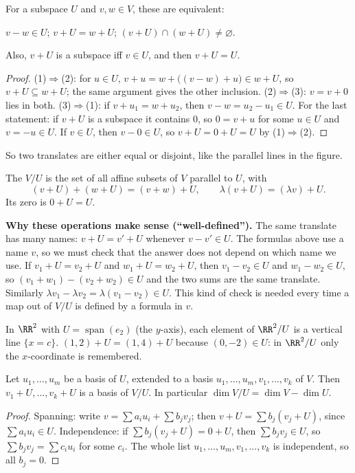 \documentclass[10pt]{scrartcl}
\DeclareMathOperator{\spn}{span}
\begin{document}
\begin{proposition*}
  For a subspace $U$ and $v,w\in V$, these are equivalent:
  \begin{enumerate}
    \ii $v-w\in U$;
    \ii $v+U=w+U$;
    \ii $(v+U)\cap(w+U)\ne\varnothing$.
  \end{enumerate}
  Also, $v+U$ is a subspace iff $v\in U$, and then $v+U=U$.
\end{proposition*}
\begin{proof}
  (1)$\Rightarrow$(2): for $u\in U$, $v+u=w+\big((v-w)+u\big)\in w+U$, so $v+U\subseteq w+U$; the same argument gives the other inclusion. (2)$\Rightarrow$(3): $v=v+0$ lies in both. (3)$\Rightarrow$(1): if $v+u_1=w+u_2$, then $v-w=u_2-u_1\in U$.
  For the last statement: if $v+U$ is a subspace it contains $0$, so $0=v+u$ for some $u\in U$ and $v=-u\in U$. If $v\in U$, then $v-0\in U$, so $v+U=0+U=U$ by (1)$\Rightarrow$(2).
\end{proof}
So two translates are either equal or disjoint, like the parallel lines in the figure.

\begin{definition*}[Def.~24]
  The  $V/U$ is the set of all affine subsets of $V$ parallel to $U$, with
  \[ (v+U)+(w+U)=(v+w)+U,\qquad\lambda(v+U)=(\lambda v)+U. \]
  Its zero is $0+U=U$.
\end{definition*}
\textbf{Why these operations make sense (``well-defined'').} The same translate has many names: $v+U=v'+U$ whenever $v-v'\in U$. The formulas above use a name $v$, so we must check that the answer does not depend on which name we use. If $v_1+U=v_2+U$ and $w_1+U=w_2+U$, then $v_1-v_2\in U$ and $w_1-w_2\in U$, so $(v_1+w_1)-(v_2+w_2)\in U$ and the two sums are the same translate. Similarly $\lambda v_1-\lambda v_2=\lambda(v_1-v_2)\in U$. This kind of check is needed every time a map out of $V/U$ is defined by a formula in $v$.

\begin{example*}
  In $\RR^2$ with $U=\spn(e_2)$ (the $y$-axis), each element of $\RR^2/U$ is a vertical line $\{x=c\}$. $(1,2)+U=(1,4)+U$ because $(0,-2)\in U$: in $\RR^2/U$ only the $x$-coordinate is remembered.
\end{example*}

\begin{proposition*}
  Let $u_1,\dots,u_m$ be a basis of $U$, extended to a basis $u_1,\dots,u_m,v_1,\dots,v_k$ of $V$. Then $v_1+U,\dots,v_k+U$ is a basis of $V/U$. In particular $\dim V/U=\dim V-\dim U$.
\end{proposition*}
\begin{proof}
  Spanning: write $v=\sum a_iu_i+\sum b_jv_j$; then $v+U=\sum b_j(v_j+U)$, since $\sum a_iu_i\in U$. Independence: if $\sum b_j(v_j+U)=0+U$, then $\sum b_jv_j\in U$, so $\sum b_jv_j=\sum c_iu_i$ for some $c_i$. The whole list $u_1,\dots,u_m,v_1,\dots,v_k$ is independent, so all $b_j=0$.
\end{proof}
\end{document}
